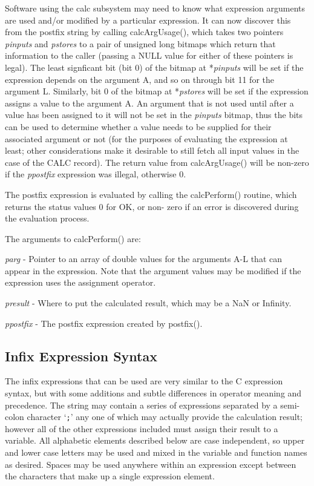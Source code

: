 Software using the calc subsystem may need to know what expression arguments are used and/or modified by a particular 
expression. It can now discover this from the postfix string by calling calcArgUsage(), which takes two pointers \emph{pinputs} 
and \emph{pstores} to a pair of unsigned long bitmaps which return that information to the caller (passing a NULL value for either 
of these pointers is legal). The least signficant bit (bit 0) of the bitmap at *\emph{pinputs} will be set if the expression depends on 
the argument A, and so on through bit 11 for the argument L. Similarly, bit 0 of the bitmap at *\emph{pstores} will be set if the 
expression assigns a value to the argument A. An argument that is not used until after a value has been assigned to it will 
not be set in the \emph{pinputs} bitmap, thus the bits can be used to determine whether a value needs to be supplied for their 
associated argument or not (for the purposes of evaluating the expression at least; other considerations make it desirable 
to still fetch all input values in the case of the CALC record). The return value from calcArgUsage() will be non-zero if 
the \emph{ppostfix} expression was illegal, otherwise 0.

The postfix expression is evaluated by calling the calcPerform() routine, which returns the status values 0 for OK, or non-
zero if an error is discovered during the evaluation process.

The arguments to calcPerform() are:

\begin{description}
\item \emph{parg} - Pointer to an array of double values for the arguments A-L that can appear in the expression. Note that the 
argument values may be modified if the expression uses the assignment operator.

\item \emph{presult} - Where to put the calculated result, which may be a NaN or Infinity.

\item \emph{ppostfix} - The postfix expression created by postfix().

\end{description}

\subsection{Infix Expression Syntax}

The infix expressions that can be used are very similar to the C expression syntax, but with some additions and subtle 
differences in operator meaning and precedence. The string may contain a series of expressions separated by a semi-colon 
character `\verb|;|' any one of which may actually provide the calculation result; however all of the other expressions included 
must assign their result to a variable. All alphabetic elements described below are case independent, so upper and lower 
case letters may be used and mixed in the variable and function names as desired. Spaces may be used anywhere within an 
expression except between the characters that make up a single expression element.


